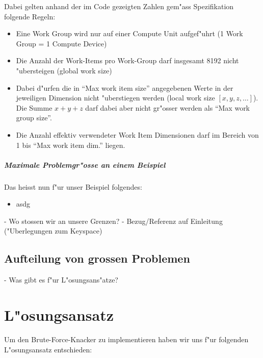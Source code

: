 \begin{refsection}
\begin{description}
\end{description}


\noindent Dabei gelten anhand der im Code gezeigten Zahlen gem"ass
Spezifikation\cite{crypto:opencl_ref} folgende Regeln:

\begin{itemize}
 \item Eine Work Group wird nur auf einer Compute Unit aufgef"uhrt (1 Work Group = 1 
       Compute Device) 
 \item Die Anzahl der Work-Items pro Work-Group darf insgesamt 8192 nicht "ubersteigen (global work size)
 \item Dabei d"urfen die in ``Max work item size'' angegebenen Werte in der jeweiligen 
       Dimension nicht "uberstiegen werden (local work size $[x,y,z,\ldots]$).
			 Die Summe $x + y + z$ darf dabei aber nicht gr"osser werden als ``Max work group size''.
 \item Die Anzahl effektiv verwendeter Work Item Dimensionen darf im Bereich von 1 bis
       ``Max work item dim.'' liegen.
\end{itemize}


\subparagraph{Maximale Problemgr"osse an einem Beispiel}

Das heisst nun f"ur unser Beispiel folgendes:

\begin{itemize}
 \item asdg
\end{itemize}








- Wo stossen wir an unsere Grenzen?
- Bezug/Referenz auf Einleitung ("Uberlegungen zum Keyspace)

\subsection{Aufteilung von grossen Problemen}

- Was gibt es f"ur L"osungsans"atze?




\section{L"osungsansatz}


Um den Brute-Force-Knacker zu implementieren haben wir uns f"ur folgenden
L"osungsansatz entschieden:


\end{refsection}
